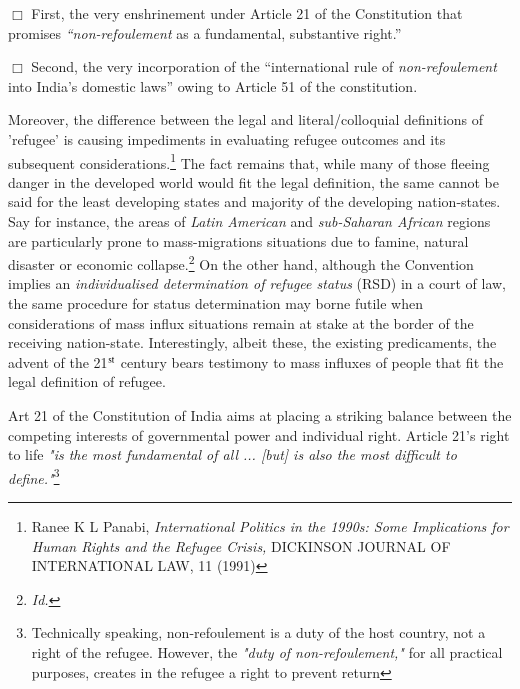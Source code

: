 \begin{multicols}{2}
\noi
$\Box$ First, the very enshrinement under Article 21 of the Constitution that promises \textit{“non-refoulement} as a fundamental, substantive right.”

\vspace{-.12cm}

\noi
$\Box$ Second, the very incorporation of the “international rule of \textit{non-refoulement} into India's
domestic laws” owing to Article 51 of the constitution.

\vspace{-.12cm}

\noi
Moreover, the difference between the legal and literal/colloquial definitions of 'refugee' is
causing impediments in evaluating refugee outcomes and its subsequent considerations.\footnote{Ranee K L Panabi, \textit{International Politics in the 1990s: Some Implications for Human Rights and the Refugee Crisis,} DICKINSON JOURNAL OF INTERNATIONAL LAW, 11 (1991)} The fact remains that, while many of those fleeing danger in the developed world would fit the legal definition, the same cannot be said for the least developing states and majority of the
developing nation-states. Say for instance, the areas of \textit{Latin American} and \textit{sub-Saharan
African} regions are particularly prone to mass-migrations situations due to famine, natural
disaster or economic collapse.\footnote{\textit{Id.}} On the other hand, although the Convention implies an
\textit{individualised determination of refugee status} (RSD) in a court of law, the same procedure for
status determination may borne futile when considerations of mass influx situations remain at
stake at the border of the receiving nation-state. Interestingly, albeit these, the existing
predicaments, the advent of the 21$^{\rm st}$ century bears testimony to mass influxes of people that
fit the legal definition of refugee.

\vspace{-.12cm}


\vspace{-.1cm}

\noi
Art 21 of the Constitution of India aims at placing a striking balance between the competing
interests of governmental power and individual right. Article 21's right to life \textit{"is the most
fundamental of all ... [but] is also the most difficult to define."}\footnote{Technically speaking, non-refoulement is a duty of the host country, not a right of the refugee. However, the \textit{"duty of non-refoulement,"} for all practical purposes, creates in the refugee a right to prevent return}


\end{multicols}
